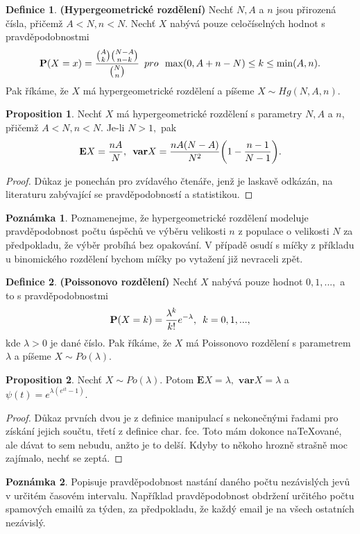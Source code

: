 \documentclass[a4]{report}
\theoremstyle{definition}
\newtheorem{definition}{Definice}[section]
\newtheorem{remark}{Poznámka}[section]
\newtheorem{proposition}{Proposition}[section]
\begin{document}
{\begin{definition}{\textbf{(Hypergeometrické rozdělení)}}
Nechť $N, A$ a $n$ jsou přirozená čísla, přičemž $A < N, n < N$. Nechť $X$ nabývá pouze celočíselných hodnot s pravděpodobnostmi 
\begin{equation}
\textbf{P}(X = x)= \frac{\binom{A}{k}\binom{N-A}{n-k}}{\binom{N}{n}} \enskip pro \enskip \max(0, A + n -N)\leq k \leq \min(A, n).
\end{equation}
Pak říkáme, že $X$ má hypergeometrické rozdělení a píšeme $X \sim Hg(N,A,n)$.
\end{definition}
\begin{proposition}
Nechť $X$ má hypergeometrické rozdělení s parametry $N, A$ a $n$, přičemž $A < N, n < N$.  Je-li $N > 1,$ pak 
\begin{equation}
\mathbf{E}X = \frac{nA}{N}, \enskip \mathbf{var}X = \frac{nA(N-A)}{N^{2}}\bigg( 1 - \frac{n-1}{N-1}\bigg).
\end{equation}
\end{proposition}
\begin{proof}
Důkaz je ponechán pro zvídavého čtenáře, jenž je laskavě odkázán, na literaturu zabývající se pravděpodobností a statistikou.
\end{proof}

\begin{remark}
Poznamenejme, že hypergeometrické rozdělení modeluje pravděpodobnost počtu úspěchů ve výběru velikosti $n$ z populace o velikosti $N$ za předpokladu, že výběr probíhá bez opakování. V případě osudí s míčky z příkladu u binomického rozdělení bychom míčky po vytažení již nevraceli zpět.
\end{remark}

\begin{definition}{\textbf{(Poissonovo rozdělení)}}
Nechť $X$ nabývá pouze hodnot $0, 1, ..., $ a to s pravděpodobnostmi 
\begin{equation}
\textbf{P}(X = k) = \frac{\lambda^{k}}{k!}e^{-\lambda},\enskip k = 0, 1, ...,
\end{equation}
kde $\lambda >0$ je dané číslo. Pak říkáme, že $X$ má Poissonovo rozdělení s parametrem $\lambda$ a píšeme $X \sim Po(\lambda)$.
\end{definition}

\begin{proposition}
Nechť $X \sim Po(\lambda)$. Potom $\mathbf{E}X = \lambda,$ $\mathbf{var}X = \lambda$ a $\psi(t) = e^{\lambda(e^{it}-1)}$.
\end{proposition}
\begin{proof}
Důkaz prvních dvou je z definice manipulací s nekonečnými řadami pro získání jejich součtu, třetí z definice char. fce. Toto mám dokonce naTeXované, ale dávat to sem nebudu, anžto je to delší. Kdyby to někoho hrozně strašně moc zajímalo, nechť se zeptá.
\end{proof}
\begin{remark}
Popisuje pravděpodobnost nastání daného počtu nezávislých jevů v určitém časovém intervalu. Například pravděpodobnost obdržení určitého počtu spamových emailů za týden, za předpokladu, že každý email je na všech ostatních nezávislý.
\end{remark}



}
\end{document}
